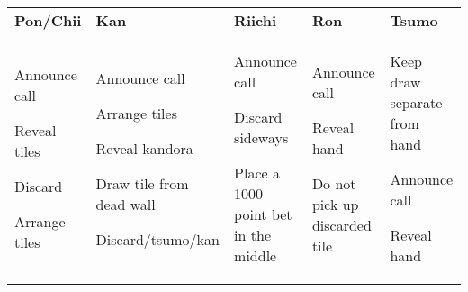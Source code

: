 \begin{tabularx}{\linewidth}{XXXXX}
  {\large\bfseries Pon/Chii} & {\large\bfseries Kan} & {\large\bfseries Riichi} & {\large\bfseries Ron} & {\large\bfseries Tsumo}\\
  \begin{callprocedure}
    \item Announce call
    \item Reveal tiles
    \item Discard
    \item Arrange tiles
  \end{callprocedure} &
  \begin{callprocedure}
    \item Announce call
    \item Arrange tiles
    \item Reveal kandora
    \item Draw tile from dead wall
    \item Discard/\linebreak[0]tsumo/\linebreak[0]kan
  \end{callprocedure} &
  \begin{callprocedure}
    \item Announce call
    \item Discard sideways
    \item Place a 1000-point bet in the middle
  \end{callprocedure} &
  \begin{callprocedure}
    \item Announce call
    \item Reveal hand
    \item Do not pick up discarded tile
  \end{callprocedure} &
  \begin{callprocedure}
  \item Keep draw separate from hand
  \item Announce call
  \item Reveal hand
  \end{callprocedure}

\end{tabularx}
